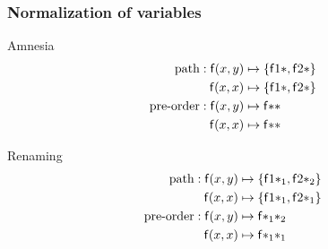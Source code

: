 
\begin{frame}
	\frametitle{Normalization of variables}
	
	\begin{exampleblock}{Amnesia}
		\vspace{-1em}
	\begin{align*}
		\text{path}: {\mathsf f}(x,y)  &\mapsto \{ {\mathsf f} 1 {*}, {\mathsf f} 2 {*} \}\\
			{\mathsf f}(x,x)  &\mapsto \{ {\mathsf f} 1 {*}, {\mathsf f} 2 {*} \}\\
		\text{pre-order}:
		{\mathsf f}(x,y) &\mapsto {\mathsf f} {*} {*} \\
		{\mathsf f}(x,x) &\mapsto {\mathsf f} {*} {*}
			\end{align*}
			\end{exampleblock}
%	

\begin{exampleblock}{Renaming}
	\vspace{-1em}	
	\begin{align*}
		\text{path}: {\mathsf f}(x,y)  &\mapsto \{ {\mathsf f} 1 {*_1}, {\mathsf f} 2 {*_2} \}\\
		{\mathsf f}(x,x)  &\mapsto \{ {\mathsf f} 1 {*_1}, {\mathsf f} 2 {*_1} \}\\
		\text{pre-order}:
		{\mathsf f}(x,y) &\mapsto {\mathsf f} {*_1} {*_2} \\
		{\mathsf f}(x,x) &\mapsto {\mathsf f} {*_1} {*_1}
	\end{align*}
	\end{exampleblock}
	\end{frame}